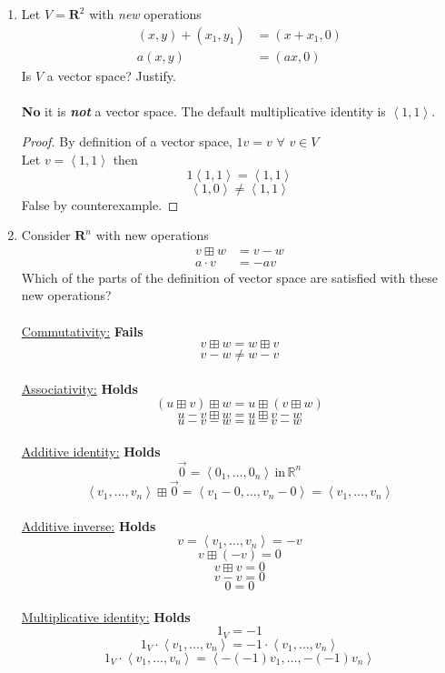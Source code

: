 \documentclass[12pt]{article}
\newcommand{\R}{\mathbb{R}}
\renewcommand{\vector}[1]{\left\langle{#1}\right\rangle}
\begin{document}
\begin{enumerate}
\begin{proof}
\end{proof}\vspace{0.4in}
\item Let $V = \mathbf{R}^2$ with \emph{new} operations
\begin{align*}
    (x,y)+(x_1,y_1) &= (x+x_1,0) \\
    a(x,y) &=(ax,0)
\end{align*}
Is $V$ a vector space?  Justify.
\\\\\textbf{No} it is \textbf{\textit{not}} a vector space. The default multiplicative identity is $\vector{1,1}$.
\begin{proof}
    By definition of a vector space, $1v = v \,\, \forall \,\, v \in V$
    \\Let $v = \vector{1,1}$ then
    $$1\vector{1,1} = \vector{1,1}$$
    $$\vector{1,0} \not= \vector{1,1}$$
    False by counterexample.
\end{proof}\vspace{0.4in}
\item Consider $\mathbf{R}^n$ with new operations
\begin{align*}
    v \boxplus w &= v-w \\
    a \cdot v &= -a v
\end{align*}
Which of the parts of the definition of vector space are satisfied with these new operations?
\\\\
    \underline{Commutativity:} \textbf{Fails}
    $$v \boxplus w = w \boxplus v$$
    $$v-w \not = w-v$$
    \\
    \underline{Associativity:} \textbf{Holds}
    $$(u \boxplus v) \boxplus w = u \boxplus (v \boxplus w)$$
    $$u - v \boxplus w = u \boxplus v - w$$
    $$u - v - w = u - v - w$$
    \\
    \underline{Additive identity:} \textbf{Holds}
    $$\Vec{0} = \vector{0_1, \dots, 0_n}\, \text{in} \, \R^n$$
    $$\vector{v_1,\dots,v_n} \boxplus \Vec{0} = \vector{v_1-0,\dots, v_n-0} = \vector{v_1,\dots, v_n}$$
    \\
    \underline{Additive inverse:} \textbf{Holds}
    $$v = \vector{v_1, \dots, v_n} = -v$$
    $$v \boxplus (-v) = 0$$
    $$v \boxplus v = 0$$
    $$v - v = 0$$
    $$0 = 0$$
    \\
    \underline{Multiplicative identity:} \textbf{Holds}
    $$1_V = -1$$
    $$1_V \cdot \vector{v_1, \dots, v_n} = -1 \cdot \vector{v_1, \dots, v_n}$$
    $$1_V \cdot \vector{v_1, \dots, v_n} = \vector{-(-1)v_1, \dots, -(-1)v_n}$$

\end{enumerate}
\end{document}

